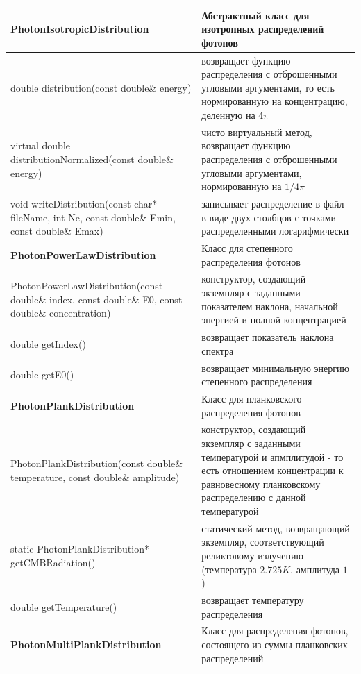 \begin{small}
	\label{photonDistributionMethods}
	\begin{xtabular}{|p{0.45\textwidth}|p{0.55\textwidth}|}
				\hline
				\textbf{PhotonIsotropicDistribution} & Абстрактный класс для изотропных распределений фотонов\\
				\hline
				double distribution(const double\& energy) & возвращает функцию распределения с отброшенными угловыми аргументами, то есть нормированную на концентрацию, деленную на $4 \pi$ \\
				\hline
				virtual double distributionNormalized(const double\& energy) & чисто виртуальный метод, возвращает функцию распределения с отброшенными угловыми аргументами, нормированную на  $ 1 / 4 \pi$\\
				\hline
				void writeDistribution(const char* fileName, int Ne, const double\& Emin, const double\& Emax) & записывает распределение в файл в виде двух столбцов с точками распределенными логарифмически\\
				\hline
				\textbf{PhotonPowerLawDistribution} & Класс для степенного распределения фотонов\\
				\hline
				PhotonPowerLawDistribution(const double\& index, const double\& E0, const double\& concentration) & конструктор, создающий экземпляр с заданными показателем наклона, начальной энергией и полной концентрацией \\
				\hline
				double getIndex() & возвращает показатель наклона спектра\\
				\hline
				double getE0() & возвращает минимальную энергию степенного распределения\\
				\hline
				\textbf{PhotonPlankDistribution} & Класс для планковского распределения фотонов\\
				\hline
				PhotonPlankDistribution(const double\& temperature, const double\& amplitude) & конструктор, создающий экземпляр с заданными температурой и апмплитудой - то есть отношением концентрации к равновесному планковскому распределению с данной температурой\\
				\hline
				static PhotonPlankDistribution* getCMBRadiation() & статический метод, возвращающий экземпляр, соответствующий реликтовому излучению (температура $2.725 K$, амплитуда $1$)\\
				\hline
				double getTemperature() & возвращает температуру распределения\\
				\hline
				\textbf{PhotonMultiPlankDistribution} & Класс для распределения фотонов, состоящего из суммы планковских распределений\\

\end{xtabular}
\end{small}
